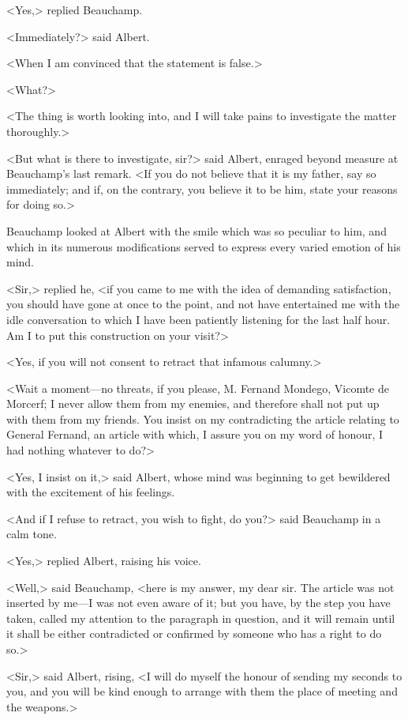  <Yes,> replied Beauchamp. 

 <Immediately?> said Albert. 

 <When I am convinced that the statement is false.> 

 <What?> 

 <The thing is worth looking into, and I will take pains to investigate the matter thoroughly.> 

 <But what is there to investigate, sir?> said Albert, enraged beyond measure at Beauchamp's last remark. <If you do not believe that it is my father, say so immediately; and if, on the contrary, you believe it to be him, state your reasons for doing so.> 

 Beauchamp looked at Albert with the smile which was so peculiar to him, and which in its numerous modifications served to express every varied emotion of his mind. 

 <Sir,> replied he, <if you came to me with the idea of demanding satisfaction, you should have gone at once to the point, and not have entertained me with the idle conversation to which I have been patiently listening for the last half hour. Am I to put this construction on your visit?> 

 <Yes, if you will not consent to retract that infamous calumny.> 

 <Wait a moment—no threats, if you please, M. Fernand Mondego, Vicomte de Morcerf; I never allow them from my enemies, and therefore shall not put up with them from my friends. You insist on my contradicting the article relating to General Fernand, an article with which, I assure you on my word of honour, I had nothing whatever to do?> 

 <Yes, I insist on it,> said Albert, whose mind was beginning to get bewildered with the excitement of his feelings. 

 <And if I refuse to retract, you wish to fight, do you?> said Beauchamp in a calm tone. 

 <Yes,> replied Albert, raising his voice. 

 <Well,> said Beauchamp, <here is my answer, my dear sir. The article was not inserted by me—I was not even aware of it; but you have, by the step you have taken, called my attention to the paragraph in question, and it will remain until it shall be either contradicted or confirmed by someone who has a right to do so.> 

 <Sir,> said Albert, rising, <I will do myself the honour of sending my seconds to you, and you will be kind enough to arrange with them the place of meeting and the weapons.> 

